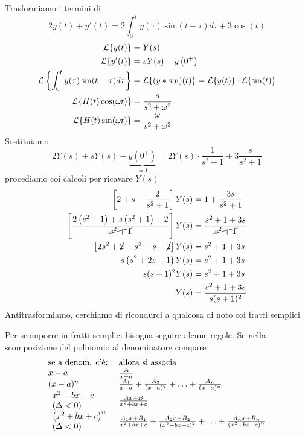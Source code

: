 Trasformiamo i termini di
\begin{equation*}
2y(t) + y'(t) = 2\int ^{t}_{0} y(\tau)\sin(t - \tau) d\tau + 3\cos(t)
\end{equation*}
\begin{align*}
\mathcal{L}\{y(t)\} & = Y(s)\\
\mathcal{L}\{y'(t)\} & = sY(s) - y\left(0^{ + }\right)\\
\mathcal{L}\left\{\int ^{t}_{0} y(\tau)\sin(t - \tau) d\tau \right\} & = \mathcal{L}\{(y*\sin)(t)\} = \mathcal{L}\{y(t)\} \cdot \mathcal{L}\{\sin(t)\}\\
\mathcal{L}\{H(t)\cos(\omega t)\} & = \frac{s}{s^{2} + \omega ^{2}}\\
\mathcal{L}\{H(t)\sin(\omega t)\} & = \frac{\omega }{s^{2} + \omega ^{2}}
\end{align*}
Sostituiamo
\begin{equation*}
2Y(s) + sY(s) - \underbrace{y\left(0^{ + }\right)}_{ = 1} = 2Y(s) \cdot \frac{1}{s^{2} + 1} + 3\frac{s}{s^{2} + 1}
\end{equation*}
procediamo coi calcoli per ricavare $Y(s)$
\begin{align*}
\left[ 2 + s - \frac{2}{s^{2} + 1}\right] Y(s) & = 1 + \frac{3s}{s^{2} + 1}\\
\left[\frac{2\left(s^{2} + 1\right) + s\left(s^{2} + 1\right) - 2}{\cancel{s^{2} + 1}}\right] Y(s) & = \frac{s^{2} + 1 + 3s}{\cancel{s^{2} + 1}}\\
\left[ 2s^{2} + \cancel{2} + s^{3} + s - \cancel{2}\right] Y(s) & = s^{2} + 1 + 3s\\
s\left(s^{2} + 2s + 1\right) Y(s) & = s^{2} + 1 + 3s\\
s(s + 1)^{2} Y(s) & = s^{2} + 1 + 3s\\
Y(s) & = \frac{s^{2} + 1 + 3s}{s(s + 1)^{2}}
\end{align*}
Antitrasformiamo, cerchiamo di ricondurci a qualcosa di noto coi fratti semplici
\begin{rem}
Per scomporre in fratti semplici bisogna seguire alcune regole. Se nella scomposizione del polinomio al denominatore compare:
\begin{equation*}
\begin{array}{ l l }
\text{se a denom. c'è:} & \text{allora si associa}\\
x - a & \frac{A}{x - a}\\
(x - a)^{n} & \frac{A_{1}}{x - a} + \frac{A_{2}}{(x - a)^{2}} + \dotsc + \frac{A_{n}}{(x - a)^{n}}\\
 \begin{array}{l}
x^{2} + bx + c\\
(\Delta < 0)
\end{array} & \frac{Ax + B}{x^{2} + bx + c}\\
 \begin{array}{l}
\left(x^{2} + bx + c\right)^{n}\\
(\Delta < 0)
\end{array} & \frac{A_{1} x + B_{1}}{x^{2} + bx + c} + \frac{A_{2} x + B_{2}}{\left(x^{2} + bx + c\right)^{2}} + \dotsc + \frac{A_{n} x + B_{n}}{\left(x^{2} + bx + c\right)^{n}}
\end{array}
\end{equation*}
\end{rem}
